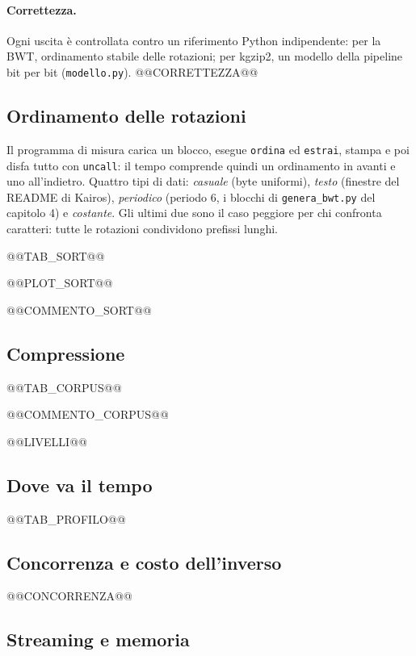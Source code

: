 \documentclass[11pt,a4paper]{article}
\newcommand{\kw}[1]{\texttt{#1}}
\begin{document}
\paragraph{Correttezza.} Ogni uscita è controllata contro un riferimento Python indipendente: per la BWT, ordinamento stabile delle rotazioni; per kgzip2, un modello della pipeline bit per bit (\kw{modello.py}). @@CORRETTEZZA@@

\subsection{Ordinamento delle rotazioni}

Il programma di misura carica un blocco, esegue \kw{ordina} ed \kw{estrai}, stampa e poi disfa tutto con \kw{uncall}: il tempo comprende quindi un ordinamento in avanti e uno all'indietro. Quattro tipi di dati: \emph{casuale} (byte uniformi), \emph{testo} (finestre del README di Kairos), \emph{periodico} (periodo 6, i blocchi di \kw{genera\_bwt.py} del capitolo 4) e \emph{costante}. Gli ultimi due sono il caso peggiore per chi confronta caratteri: tutte le rotazioni condividono prefissi lunghi.

@@TAB_SORT@@

@@PLOT_SORT@@

@@COMMENTO_SORT@@

\subsection{Compressione}

@@TAB_CORPUS@@

@@COMMENTO_CORPUS@@

@@LIVELLI@@

\subsection{Dove va il tempo}

@@TAB_PROFILO@@

\subsection{Concorrenza e costo dell'inverso}

@@CONCORRENZA@@

\subsection{Streaming e memoria}
\label{sec:memoria}
\end{document}
